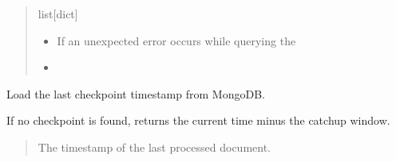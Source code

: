 \documentclass[letterpaper,10pt,english]{sphinxmanual}
\begin{document}
\begin{fulllineitems}
\begin{quote}
\begin{description}
\begin{description}
\begin{itemize}
\end{itemize}

\end{description}


\sphinxAtStartPar
list{[}dict{]}

\begin{itemize}
\item {} 
\sphinxAtStartPar
{} \textendash{} If an unexpected error occurs while querying the

\item {} 
\sphinxAtStartPar
{}\sphinxstyleliteralstrong{\sphinxupquote{, }} \textendash{} 

\end{itemize}

\end{description}\end{quote}

\end{fulllineitems}


\begin{fulllineitems}
\label{\detokenize{modules/src.pig_sorting_api.main:src.pig_sorting_api.main.get_last_checkpoint}}
\pysigstartsignatures
\pysiglinewithargsret
{}
{}
{}
\pysigstopsignatures
\sphinxAtStartPar
Load the last checkpoint timestamp from MongoDB.

\sphinxAtStartPar
If no checkpoint is found, returns the current time minus the catch\sphinxhyphen{}up window.
\begin{quote}\begin{description}
\sphinxAtStartPar
The timestamp of the last processed document.

\sphinxAtStartPar
{\hyperref[\detokenize{modules/src.pig_sorting_api.main:src.pig_sorting_api.main.datetime}]{}}

\end{description}\end{quote}

\end{fulllineitems}
\end{document}
